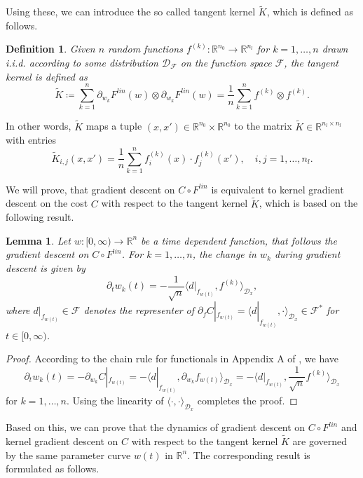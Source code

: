 \documentclass[11pt, a4paper]{article}
\newtheorem{lemma}[theorem]{Lemma}
\newtheorem{definition}[theorem]{Definition}
\newcommand{\R}{\mathbb{R}}
\newcommand{\D}{\mathcal{D}}
\newcommand{\F}{\mathcal{F}}
\begin{document}
Using these, we can introduce the so called tangent kernel $\tilde{K}$, which is defined as follows.

\begin{definition}
Given $n$ random functions $f^{(k)} : \R^{n_0} \to \R^{n_l}$ for $k=1,\dots,n$ drawn i.i.d. according to some distribution $\D_{\F}$ on the function space $\F$, the tangent kernel is defined as
\[ \tilde{K} \coloneq \sum_{k=1}^{n} \partial_{w_k} F^\textit{lin}(w) \otimes \partial_{w_k} F^\textit{lin}(w) = \frac{1}{n} \sum_{k=1}^{n} f^{(k)} \otimes f^{(k)}. \]
\end{definition}

In other words, $\tilde{K}$ maps a tuple $(x,x') \in \R^{n_0} \times \R^{n_0}$ to the matrix $\tilde{K} \in \R^{n_l \times n_l}$ with entries 
\[ \tilde{K}_{i,j}(x,x') = \frac{1}{n} \sum_{k=1}^{n} f_i^{(k)}(x) \cdot f_j^{(k)}(x'), \quad  i,j=1,\dots,n_l. \]

We will prove, that gradient descent on $C \circ F^\textit{lin}$ is equivalent to kernel gradient descent on the cost $C$ with respect to the tangent kernel $\tilde{K}$, which is based on the following result.

\begin{lemma} \label{lem:evolution}
Let $w: [0, \infty) \to \R^n$ be a time dependent function, that follows the gradient descent on $C \circ F^\textit{lin}$. For $k=1, \dots, n$, the change in $w_k$ during gradient descent is given by
\[ \partial_tw_k(t) = - \frac{1}{\sqrt{n}} \big \langle d|_{f_{w(t)}}, f^{(k)} \big \rangle_{\D_x}, \]
where $d|_{f_{w(t)}} \in \F$ denotes the representer of $\partial_f C|_{f_{w(t)}} = \big \langle d|_{f_{w(t)}}, \cdot \big \rangle_{\D_x} \in \F^*$ for $t \in [0,\infty)$.
\end{lemma}

\begin{proof}
According to the chain rule for functionals in Appendix A of \cite{Functionals}, we have
\[ \partial_tw_k(t) = - \partial_{w_{k}} C|_{f_{w(t)}} = - \big \langle d|_{f_{w(t)}}, \partial_{w_k} f_{w(t)} \big \rangle_{\D_x} = - \big \langle d|_{f_{w(t)}}, \frac{1}{\sqrt{n}} f^{(k)} \big \rangle_{\D_x} \]
for $k = 1, \dots, n$. Using the linearity of $\langle \cdot, \cdot \rangle_{\D_x}$ completes the proof.
\end{proof}

Based on this, we can prove that the dynamics of gradient descent on $C \circ F^\textit{lin}$ and kernel gradient descent on $C$ with respect to the tangent kernel $\tilde{K}$ are governed by the same parameter curve $w(t)$ in $\R^n$. The corresponding result is formulated as follows.
\end{document}
